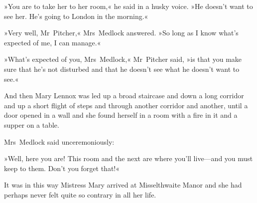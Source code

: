 »You are to take her to her room,« he said in a husky voice. »He doesn't want to see her. He's going to London in the morning.«

»Very well, Mr~Pitcher,« Mrs~Medlock answered. »So long as I know what's expected of me, I can manage.«

»What's expected of you, Mrs~Medlock,« Mr~Pitcher said, »is that you make sure that he's not disturbed and that he doesn't see what he doesn't want to see.«

And then Mary Lennox was led up a broad staircase and down a long corridor and up a short flight of steps and through another corridor and another, until a door opened in a wall and she found herself in a room with a fire in it and a supper on a table.

Mrs~Medlock said unceremoniously:

»Well, here you are! This room and the next are where you'll live—and you must keep to them. Don't you forget that!«

It was in this way Mistress Mary arrived at Misselthwaite Manor and she had perhaps never felt quite so contrary in all her life.

\begin{letter}
\enlargethispage{\baselineskip}
\end{letter}